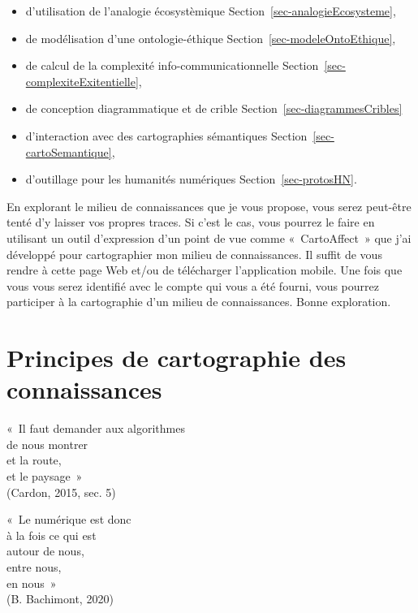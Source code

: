 \documentclass[
  a4paper,
  DIV=11,
  numbers=noendperiod]{scrreprt}
\providecommand{\tightlist}{%
  \setlength{\itemsep}{0pt}\setlength{\parskip}{0pt}}\usepackage{longtable,booktabs,array}
\begin{document}
\begin{itemize}
\tightlist
\item
  d'utilisation de l'analogie écosystèmique
  Section~\ref{sec-analogieEcosysteme},
\item
  de modélisation d'une ontologie-éthique
  Section~\ref{sec-modeleOntoEthique},
\item
  de calcul de la complexité info-communicationnelle
  Section~\ref{sec-complexiteExitentielle},
\item
  de conception diagrammatique et de crible
  Section~\ref{sec-diagrammesCribles}
\item
  d'interaction avec des cartographies sémantiques
  Section~\ref{sec-cartoSemantique},
\item
  d'outillage pour les humanités numériques Section~\ref{sec-protosHN}.
\end{itemize}

En explorant le milieu de connaissances que je vous propose, vous serez
peut-être tenté d'y laisser vos propres traces. Si c'est le cas, vous
pourrez le faire en utilisant un outil d'expression d'un point de vue
comme «~CartoAffect~» que j'ai développé pour cartographier mon milieu
de connaissances. Il suffit de vous rendre à cette page Web et/ou de
télécharger l'application mobile. Une fois que vous vous serez identifié
avec le compte qui vous a été fourni, vous pourrez participer à la
cartographie d'un milieu de connaissances. Bonne exploration.

\chapter{Principes de cartographie des
connaissances}\label{sec-principesCarto}

\label{exergue-PrincipesCarto1}
«~Il faut demander aux algorithmes\\
de nous montrer\\
et la route,\\
et le paysage~»\\
(Cardon, 2015, sec. 5)

\label{exergue-PrincipesCarto2}
«~Le numérique est donc\\
à la fois ce qui est\\
autour de nous,\\
entre nous,\\
en nous~»\\
(B. Bachimont, 2020)
\end{document}

